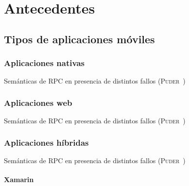 \chapter{Antecedentes}
\label{chap:antecedentes}

\section{Tipos de aplicaciones móviles}

\subsection{Aplicaciones nativas}

\begin{table}[nativas]
	\centering
	{\small
		
	}
	\caption[Semánticas de \acs{RPC} en presencia de distintos fallos]
	{Semánticas de \acs{RPC} en presencia de distintos fallos
		(\textsc{Puder}~\cite{puder05:_distr_system_archit})}
	\label{tab:nativas}
\end{table}

\subsection{Aplicaciones web}

\begin{table}[web]
	\centering
	{\small
		
	}
	\caption[Semánticas de \acs{RPC} en presencia de distintos fallos]
	{Semánticas de \acs{RPC} en presencia de distintos fallos
		(\textsc{Puder}~\cite{puder05:_distr_system_archit})}
	\label{tab:web}
\end{table}

\subsection{Aplicaciones híbridas}

\begin{table}[hibridas]
	\centering
	{\small
		
	}
	\caption[Semánticas de \acs{RPC} en presencia de distintos fallos]
	{Semánticas de \acs{RPC} en presencia de distintos fallos
		(\textsc{Puder}~\cite{puder05:_distr_system_archit})}
	\label{tab:hibridas}
\end{table}

\subsubsection{Xamarin}
